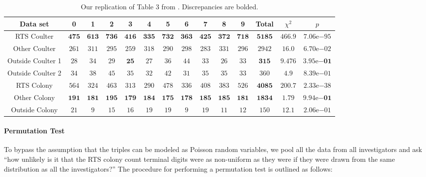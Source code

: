 \documentclass[11pt]{article}
\newcommand{\expnum}[2]{{#1}\mathrm{e}{#2}}
\begin{document}
\begin{table}
\begin{center}
\begin{tiny}
\bgroup
\def\arraystretch{1.5} %
\begin{tabular}{*{14}{c}}
\hline
Data set & 0 & 1 & 2 & 3 & 4 & 5 & 6 & 7 & 8 & 9 & Total & $\chi^2$ & $p$ \\
\hline
RTS Coulter & $\bm{475}$ & $\bm{613}$ & $\bm{736}$ & $\bm{416}$ & $\bm{335}$ & $\bm{732}$ & $\bm{363}$ & $\bm{425}$ & $\bm{372}$ & $\bm{718}$ & $\bm{5185}$ & $\bm{466.9}$ & $\expnum{7.06}{-95}$ \\
Other Coulter & $261$ & $311$ & $295$ & $259$ & $318$ & $290$ & $298$ & $283$ & $331$ & $296$ & $2942$ & $16.0$ & $\expnum{6.70}{-02}$ \\
Outside Coulter 1 & $28$ & $34$ & $29$ & $\bm{25}$ & $27$ & $36$ & $44$ & $33$ & $26$ & $33$ & $\bm{315}$ & $\bm{9.476}$ & $\bm{\expnum{3.95}{-01}}$ \\
Outside Coulter 2 & $34$ & $38$ & $45$ & $35$ & $32$ & $42$ & $31$ & $35$ & $35$ & $33$ & $360$ & $4.9$ & $\expnum{8.39}{-01}$ \\
RTS Colony & $564$ & $324$ & $463$ & $313$ & $290$ & $478$ & $336$ & $408$ & $383$ & $526$ & $\bm{4085}$ & $200.7$ & $\expnum{2.33}{-38}$ \\
Other Colony & $\bm{191}$ & $\bm{181}$ & $\bm{195}$ & $\bm{179}$ & $\bm{184}$ & $\bm{175}$ & $\bm{178}$ & $\bm{185}$ & $\bm{185}$ & $\bm{181}$ & $\bm{1834}$ & $\bm{1.79}$ & $\bm{\expnum{9.94}{-01}}$ \\
Outside Colony & $21$ & $9$ & $15$ & $16$ & $19$ & $19$ & $9$ & $19$ & $11$ & $12$ & $150$ & $12.1$ & $\expnum{2.06}{-01}$\\
\hline
\end{tabular}
\egroup
\end{tiny}
\end{center}
\caption{Our replication of Table 3 from \citet{Pitt:2016cu}. Discrepancies are bolded.}
\label{tbl:table3}
\end{table}

\paragraph{Permutation Test} To bypass the assumption that the triples can be modeled as Poisson random variables, we pool all the data from all investigators and ask ``how unlikely is it that the RTS colony count terminal digits were as non-uniform as they were if they were drawn from the same distribution as all the investigators?'' The procedure for performing a permutation test is outlined as follows:
\end{document}
